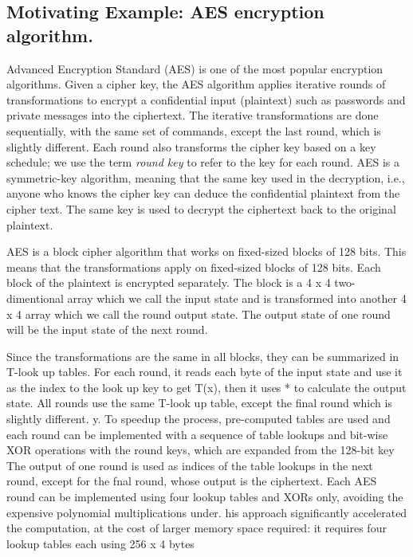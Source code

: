\subsection{Motivating Example: AES encryption algorithm.}


%
Advanced Encryption Standard (AES) is one of the most popular encryption algorithms.
%
Given a cipher key, the AES algorithm applies iterative rounds of transformations  to encrypt a confidential input (plaintext) such as passwords and private messages into the ciphertext.
%
The iterative transformations are done sequentially, with the same set of commands, except the last round, which is slightly different. 
%
Each round also transforms the cipher key based on a key schedule; we use the term {\em round key} to refer to the key for each round.
%
AES is a symmetric-key algorithm, meaning that the same key used in the decryption, i.e., anyone who knows the cipher key can deduce the confidential plaintext from the cipher text. 
%
The same key is used to decrypt the ciphertext back to the original plaintext.

AES is a block cipher algorithm that works on fixed-sized blocks of 128 bits.
%
This means that the transformations apply on fixed-sized blocks of 128 bits.
%
Each block of the plaintext is encrypted separately.
%
The block is a 4 x 4 two-dimentional array which we call the input state and is transformed into another 4 x 4 array  which we call the round output state.
%
The output state of one round will be the input state of the next round.
%


Since the transformations are the same in all blocks, they can be summarized in T-look up tables.
%
For each round, it reads each byte of the input state and use it as the index to the look up key to get T(x), then it uses * to calculate the output state. 
%
All rounds use the same T-look up table, except the final round which is slightly different.
%
y. To speedup the process,
pre-computed tables are used and each round can be implemented with a sequence of table lookups and bit-wise XOR
operations with the round keys, which are expanded from
the 128-bit key
The output of one round is used as indices of the table lookups in the next round, except for the
fnal round, whose output is the ciphertext.
Each AES round can be implemented using four lookup
tables and XORs only, avoiding the expensive polynomial multiplications under.
his approach significantly accelerated
the computation, at the cost of larger memory space required: it
requires four lookup tables each using 256 x 4 bytes

